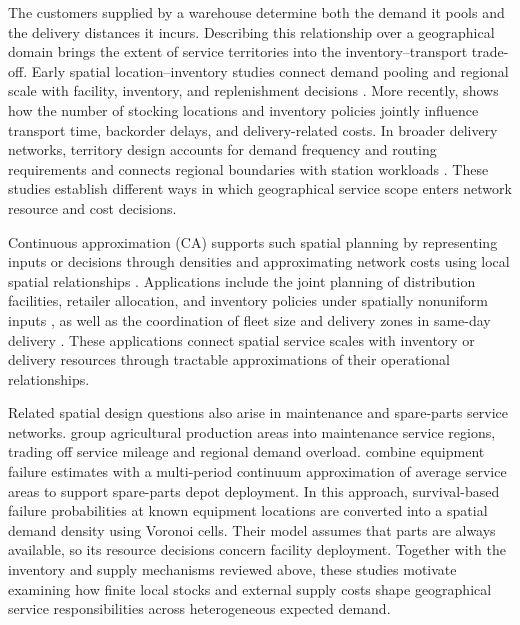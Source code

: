\documentclass[a4paper,fleqn]{cas-sc}
\theoremstyle{remark}
\theoremstyle{plain}
\begin{document}
The customers supplied by a warehouse determine both the demand it pools and the delivery distances it incurs. Describing this relationship over a geographical domain brings the extent of service territories into the inventory--transport trade-off. Early spatial location--inventory studies connect demand pooling and regional scale with facility, inventory, and replenishment decisions \citep{erlebacher2000interaction,naseraldin2008integrating}. More recently, \citet{straubert2024continuous} shows how the number of stocking locations and inventory policies jointly influence transport time, backorder delays, and delivery-related costs. In broader delivery networks, territory design accounts for demand frequency and routing requirements \citep{zhen2023territorial} and connects regional boundaries with station workloads \citep{carlsson2026equitable}. These studies establish different ways in which geographical service scope enters network resource and cost decisions.

Continuous approximation (CA) supports such spatial planning by representing inputs or decisions through densities and approximating network costs using local spatial relationships \citep{ansari2018advancements}. Applications include the joint planning of distribution facilities, retailer allocation, and inventory policies under spatially nonuniform inputs \citep{tsao2012continuous}, as well as the coordination of fleet size and delivery zones in same-day delivery \citep{banerjee2022fleet}. These applications connect spatial service scales with inventory or delivery resources through tractable approximations of their operational relationships.

Related spatial design questions also arise in maintenance and spare-parts service networks. \citet{han2020districting} group agricultural production areas into maintenance service regions, trading off service mileage and regional demand overload. \citet{mizutani2025spare} combine equipment failure estimates with a multi-period continuum approximation of average service areas to support spare-parts depot deployment. In this approach, survival-based failure probabilities at known equipment locations are converted into a spatial demand density using Voronoi cells. Their model assumes that parts are always available, so its resource decisions concern facility deployment. Together with the inventory and supply mechanisms reviewed above, these studies motivate examining how finite local stocks and external supply costs shape geographical service responsibilities across heterogeneous expected demand.
\end{document}
